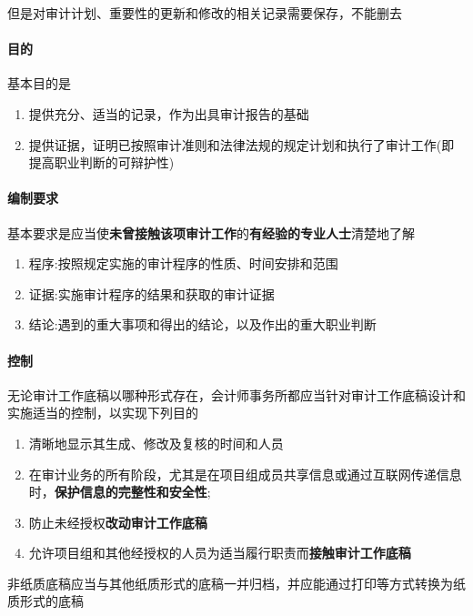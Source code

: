 \documentclass[UTF8,12pt]{ctexart}
\numberwithin{equation}{section} %
\numberwithin{figure}{section}
\numberwithin{table}{section}
\begin{document}
	但是对审计计划、重要性的更新和修改的相关记录需要保存，不能删去
	
	\paragraph{目的}
	基本目的是
	\begin{enumerate}
		\item 提供充分、适当的记录，作为出具审计报告的基础
		
		\item 提供证据，证明已按照审计准则和法律法规的规定计划和执行了审计工作(即提高职业判断的可辩护性)
	\end{enumerate}
	
	\paragraph{编制要求}
	基本要求是应当使\textbf{未曾接触该项审计工作}的\textbf{有经验的专业人士}清楚地了解
	\begin{enumerate}
		\item 程序:按照规定实施的审计程序的性质、时间安排和范围
		
		\item 证据:实施审计程序的结果和获取的审计证据
		
		\item 结论:遇到的重大事项和得出的结论，以及作出的重大职业判断
	\end{enumerate}
	
	\paragraph{控制}
	无论审计工作底稿以哪种形式存在，会计师事务所都应当针对审计工作底稿设计和实施适当的控制，以实现下列目的
	\begin{enumerate}
		\item 清晰地显示其生成、修改及复核的时间和人员
		
		\item 在审计业务的所有阶段，尤其是在项目组成员共享信息或通过互联网传递信息时，\textbf{保护信息的完整性和安全性};
		
		\item 防止未经授权\textbf{改动审计工作底稿}
		
		\item 允许项目组和其他经授权的人员为适当履行职责而\textbf{接触审计工作底稿}
	\end{enumerate}
	
	非纸质底稿应当与其他纸质形式的底稿一并归档，并应能通过打印等方式转换为纸质形式的底稿
	
\end{document}
